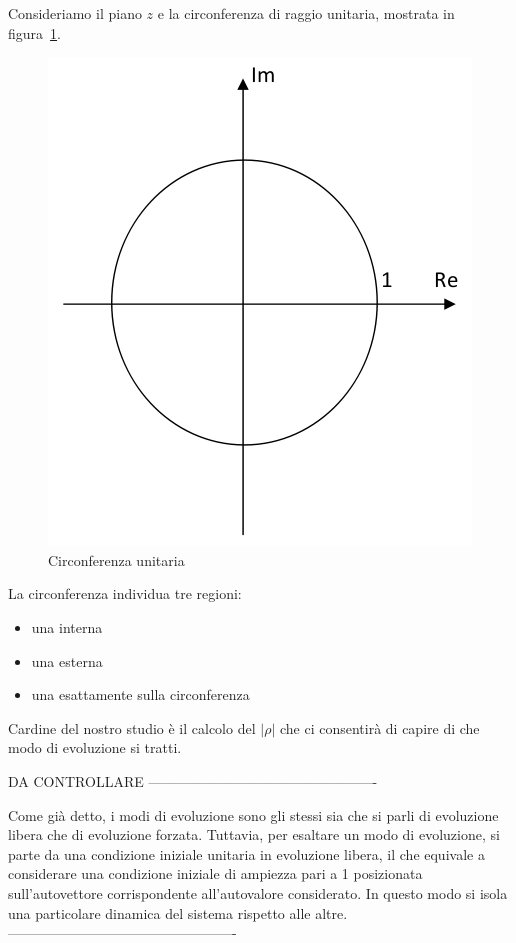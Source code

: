 \documentclass[a4paper]{report}
\begin{document}
Consideriamo il piano $z$ e la circonferenza di raggio unitaria,
mostrata in figura~\ref{fig:circonferenzaUnitaria}.
\begin{figure}[!h]
  \begin{center}
    \includegraphics[scale=0.5]{./figures/circonferenzaUnitaria}
    \caption{Circonferenza unitaria}\label{fig:circonferenzaUnitaria} 
  \end{center}
\end{figure}
La circonferenza individua tre regioni:
\begin{itemize}
\item una interna
\item una esterna
\item una esattamente sulla circonferenza
\end{itemize}

Cardine del nostro studio \`e il calcolo del $|\rho|$ che ci
consentir\`a di capire di che modo di evoluzione si tratti.

DA CONTROLLARE
-------------------------------------------------

Come gi\`a detto, i modi di evoluzione sono gli stessi sia che si parli
di evoluzione libera che di evoluzione forzata. Tuttavia, per esaltare
un modo di evoluzione, si parte da una condizione iniziale unitaria in
evoluzione libera, il che equivale a considerare una condizione
iniziale di ampiezza pari a 1 posizionata sull'autovettore
corrispondente all'autovalore considerato. In questo modo si isola una
particolare dinamica del sistema rispetto alle altre.
-------------------------------------------------
\end{document}
